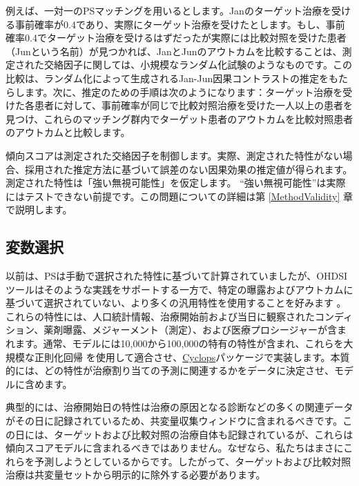 \documentclass[
  11pt]{book}
\makeatletter
\newenvironment{kframe}{%
\medskip{}
\setlength{\fboxsep}{.8em}
 \def\at@end@of@kframe{}%
 \ifinner\ifhmode%
  \def\at@end@of@kframe{\end{minipage}}%
  \begin{minipage}{\columnwidth}%
 \fi\fi%
 \def\FrameCommand##1{\hskip\@totalleftmargin \hskip-\fboxsep
 \colorbox{myShadeColor}{##1}\hskip-\fboxsep
     \hskip-\linewidth \hskip-\@totalleftmargin \hskip\columnwidth}%
 \MakeFramed {\advance\hsize-\width
   \@totalleftmargin\z@ \linewidth\hsize
   \@setminipage}}%
 {\par\unskip\endMakeFramed%
 \at@end@of@kframe}
\newenvironment{rmdblock}[1]
  {
  \begin{itemize}
  \renewcommand{\labelitemi}{
    \raisebox{-.7\height}[0pt][0pt]{
      {\setkeys{Gin}{width=3em,keepaspectratio}\texttt{[image: images/\#1]}}
    }
  }
  \setlength{\fboxsep}{1em}
  \begin{kframe}
  \item
  }
  {
  \end{kframe}
  \end{itemize}
  }
\newenvironment{rmdimportant}
  {\begin{rmdblock}{important}}
  {\end{rmdblock}}
\theoremstyle{definition}
\theoremstyle{definition}
\theoremstyle{definition}
\theoremstyle{definition}
\theoremstyle{remark}
\makeatother
\begin{document}
例えば、一対一のPSマッチングを用いるとします。Janのターゲット治療を受ける事前確率が0.4であり、実際にターゲット治療を受けたとします。もし、事前確率0.4でターゲット治療を受けるはずだったが実際には比較対照を受けた患者（Junという名前）が見つかれば、JanとJunのアウトカムを比較することは、測定された交絡因子に関しては、小規模なランダム化試験のようなものです。この比較は、ランダム化によって生成されるJan-Jun因果コントラストの推定をもたらします。次に、推定のための手順は次のようになります：ターゲット治療を受けた各患者に対して、事前確率が同じで比較対照治療を受けた一人以上の患者を見つけ、これらのマッチング群内でターゲット患者のアウトカムを比較対照患者のアウトカムと比較します。

傾向スコアは測定された交絡因子を制御します。実際、測定された特性がない場合、採用された推定方法に基づいて誤差のない因果効果の推定値が得られます。測定された特性は「強い無視可能性」を仮定します。 ``強い無視可能性''は実際にはテストできない前提です。この問題についての詳細は第 \ref{MethodValidity} 章で説明します。 

\subsection{変数選択}\label{VariableSelection}

以前は、PSは手動で選択された特性に基づいて計算されていましたが、OHDSIツールはそのような実践をサポートする一方で、特定の曝露およびアウトカムに基づいて選択されていない、より多くの汎用特性を使用することを好みます \citep{tian_2018} 。これらの特性には、人口統計情報、治療開始前および当日に観察されたコンディション、薬剤曝露、メジャーメント（測定）、および医療プロシージャーが含まれます。通常、モデルには10,000から100,000の特有の特性が含まれ、これらを大規模な正則化回帰 \citep{suchard_2013} を使用して適合させ、\href{https://ohdsi.github.io/Cyclops/}{Cyclops}パッケージで実装します。本質的には、どの特性が治療割り当ての予測に関連するかをデータに決定させ、モデルに含めます。

\begin{rmdimportant}
典型的には、治療開始日の特性は治療の原因となる診断などの多くの関連データがその日に記録されているため、共変量収集ウィンドウに含まれるべきです。この日には、ターゲットおよび比較対照の治療自体も記録されているが、これらは傾向スコアモデルに含まれるべきではありません。なぜなら、私たちはまさにこれらを予測しようとしているからです。したがって、ターゲットおよび比較対照治療は共変量セットから明示的に除外する必要があります。
\end{rmdimportant}
\end{document}
